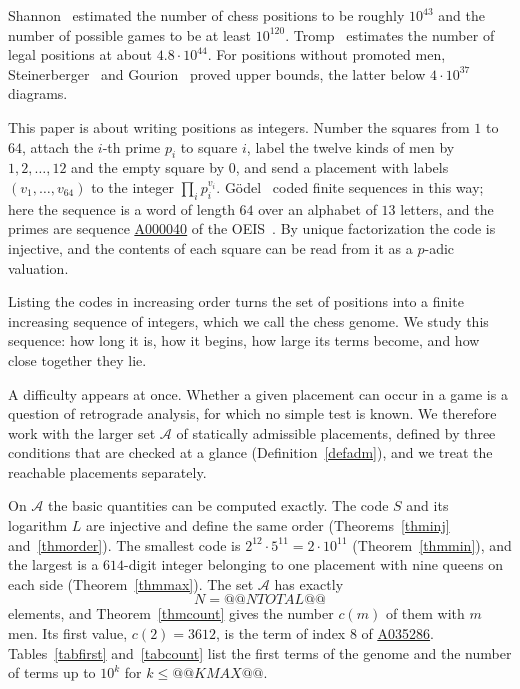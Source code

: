 \documentclass[12pt,reqno]{article}
\newcommand{\seqnum}[1]{\href{https://oeis.org/#1}{\rm \underline{#1}}}
\newcommand{\adm}{\mathcal{A}}
\begin{document}
Shannon~\cite{shannon} estimated the number of chess positions to be roughly $10^{43}$ and
the number of possible games to be at least $10^{120}$. Tromp~\cite{tromp} estimates the number of legal positions at about
$4.8\cdot 10^{44}$. For positions without promoted men, Steinerberger~\cite{steinerberger} and
Gourion~\cite{gourion} proved upper bounds, the latter below $4\cdot 10^{37}$ diagrams.

This paper is about writing positions as integers. Number the squares from
$1$ to $64$, attach the $i$-th prime $p_i$ to square $i$, label the twelve kinds of men by
$1,2,\ldots,12$ and the empty square by $0$, and send a placement with labels
$(v_1,\ldots,v_{64})$ to the integer $\prod_i p_i^{v_i}$. G\"odel~\cite{godel} coded finite
sequences in this way; here the sequence is a word of length $64$ over an alphabet of $13$
letters, and the primes are sequence \seqnum{A000040} of the OEIS~\cite{oeis}. By unique
factorization the code is injective, and the contents of each square can be read from it as a
$p$-adic valuation.

Listing the codes in increasing order turns the set of positions into a finite increasing
sequence of integers, which we call the chess genome. We study this sequence: how long it
is, how it begins, how large its terms become, and how close together they lie.

A difficulty appears at once. Whether a given placement can occur in a game is a question of
retrograde analysis, for which no simple test is known. We therefore work with the larger set
$\adm$ of statically admissible placements, defined by three conditions that are checked
at a glance (Definition~\ref{defadm}), and we treat the reachable placements separately.

On $\adm$ the basic quantities can be computed exactly. The code $S$ and its logarithm $L$ are injective and
define the same order (Theorems~\ref{thminj} and~\ref{thmorder}). The smallest code is
$2^{12}\cdot 5^{11}=2\cdot 10^{11}$ (Theorem~\ref{thmmin}), and the largest is a $614$-digit
integer belonging to one placement with nine queens on each side (Theorem~\ref{thmmax}). The
set $\adm$ has exactly
\begin{displaymath}
N=@@NTOTAL@@
\end{displaymath}
elements, and Theorem~\ref{thmcount} gives the number $c(m)$ of them with $m$ men. Its first
value, $c(2)=3612$, is the term of index $8$ of \seqnum{A035286}. Tables~\ref{tabfirst}
and~\ref{tabcount} list the first terms of the genome and the number of terms up to $10^k$ for
$k\leq @@KMAX@@$.
\end{document}
